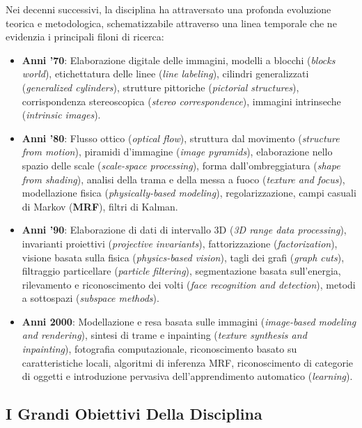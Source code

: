 ﻿\documentclass[11pt, a4paper]{article}
\begin{document}
Nei decenni successivi, la disciplina ha attraversato una profonda evoluzione teorica e metodologica, schematizzabile attraverso una linea temporale che ne evidenzia i principali filoni di ricerca:
\begin{itemize}[noitemsep]
    \item \textbf{Anni '70}: Elaborazione digitale delle immagini, modelli a blocchi (\emph{blocks world}), etichettatura delle linee (\emph{line labeling}), cilindri generalizzati (\emph{generalized cylinders}), strutture pittoriche (\emph{pictorial structures}), corrispondenza stereoscopica (\emph{stereo correspondence}), immagini intrinseche (\emph{intrinsic images}).
    \item \textbf{Anni '80}: Flusso ottico (\emph{optical flow}), struttura dal movimento (\emph{structure from motion}), piramidi d'immagine (\emph{image pyramids}), elaborazione nello spazio delle scale (\emph{scale-space processing}), forma dall'ombreggiatura (\emph{shape from shading}), analisi della trama e della messa a fuoco (\emph{texture and focus}), modellazione fisica (\emph{physically-based modeling}), regolarizzazione, campi casuali di Markov (\textbf{MRF}), filtri di Kalman.
    \item \textbf{Anni '90}: Elaborazione di dati di intervallo 3D (\emph{3D range data processing}), invarianti proiettivi (\emph{projective invariants}), fattorizzazione (\emph{factorization}), visione basata sulla fisica (\emph{physics-based vision}), tagli dei grafi (\emph{graph cuts}), filtraggio particellare (\emph{particle filtering}), segmentazione basata sull'energia, rilevamento e riconoscimento dei volti (\emph{face recognition and detection}), metodi a sottospazi (\emph{subspace methods}).
    \item \textbf{Anni 2000}: Modellazione e resa basata sulle immagini (\emph{image-based modeling and rendering}), sintesi di trame e inpainting (\emph{texture synthesis and inpainting}), fotografia computazionale, riconoscimento basato su caratteristiche locali, algoritmi di inferenza MRF, riconoscimento di categorie di oggetti e introduzione pervasiva dell'apprendimento automatico (\emph{learning}).
\end{itemize}


\newpage

\subsection{I Grandi Obiettivi Della Disciplina}
\end{document}
